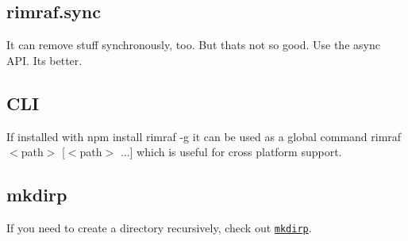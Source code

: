 \subsection*{rimraf.\+sync}

It can remove stuff synchronously, too. But that\textquotesingle{}s not so good. Use the async A\+PI. It\textquotesingle{}s better.

\subsection*{C\+LI}

If installed with {\ttfamily npm install rimraf -\/g} it can be used as a global command {\ttfamily rimraf $<$path$>$ \mbox{[}$<$path$>$ ...\mbox{]}} which is useful for cross platform support.

\subsection*{mkdirp}

If you need to create a directory recursively, check out \href{https://github.com/substack/node-mkdirp}{\tt mkdirp}. 